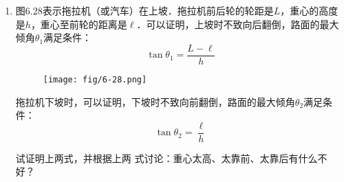 \begin{enumerate}
\item  图6.28表示拖拉机（或汽车）在上坡．拖拉机前后轮的轮距是$L$，重心的高度是$h$，重心至前轮的距离是$\ell$．可以证明，上坡时不致向后翻倒，路面的最大倾角$\theta_1$满足条件：
\[\tan\theta_1=\frac{L-\ell}{h}\]
\begin{figure}[htp]
\centering\texttt{[image: fig/6-28.png]}
\caption{}
\end{figure}
拖拉机下坡时，可以证明，下坡时不致向前翻倒，路面的最大倾角$\theta_2$满足条件：
\[\tan\theta_2=\frac{\ell}{h}\]

试证明上两式，并根据上两
式讨论：重心太高、太靠前、太靠后有什么不好？
\end{enumerate}







	
	
	
	
	
	
	
	
	
	
	
	
	
	
	
	
	
	
	
	
	
	